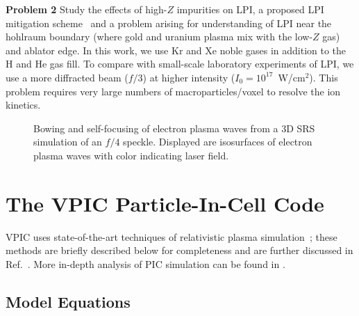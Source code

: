 \documentclass[letter,10pt]{article}
\begin{document}
\textbf{Problem 2}
Study the effects of high-$Z$ impurities on LPI, a proposed
LPI mitigation scheme~\cite{Lushnikov_PPCF_2006} and a problem 
arising for understanding of LPI near the hohlraum boundary (where gold 
and uranium plasma mix with the low-$Z$ gas) and ablator edge.  In 
this work, we use Kr and Xe noble gases in addition to the H and He gas
fill.  To compare with small-scale laboratory experiments of LPI, we
use a more diffracted beam ($f/3$) at higher intensity ($I_0 =
10^{17}$~W/cm$^2$). This problem requires very large numbers of
macroparticles/voxel to resolve the ion kinetics.




\begin{figure}
    \begin{center}
    \caption{Bowing and self-focusing of electron plasma waves from 
		a 3D SRS simulation of an $f/4$ speckle. Displayed are 
		isosurfaces of electron plasma waves with color 
		indicating laser field.}
    \label{image:lpi}
    \end{center}
\end{figure}


\section{The VPIC Particle-In-Cell Code}

VPIC uses state-of-the-art techniques of relativistic plasma 
simulation~\cite{Blahovec_et_al_2000,Eastwood_et_al_1995,Jones_et_al_1996,Kwan_Snell_1985,Nieter_Cary_2004,Verboncoeur_et_al_1995}; 
these methods are briefly described below for completeness and are
further discussed in Ref.~\cite{Bowers_et_al_Phys_Plasmas_2007}.  More
in-depth analysis of PIC simulation can be found in
\cite{Birdsall_Langdon_1985,Hockney_Eastwood_1988}.

\subsection{Model Equations}
\end{document}
